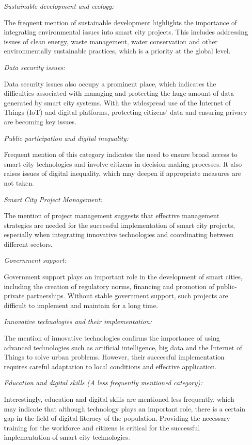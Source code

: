 \begin{multicols}{2}
\emph{Sustainable development and ecology:}

The frequent mention of sustainable development highlights the
importance of integrating environmental issues into smart city projects.
This includes addressing issues of clean energy, waste management, water
conservation and other environmentally sustainable practices, which is a
priority at the global level.

\emph{Data security issues:}

Data security issues also occupy a prominent place, which indicates the
difficulties associated with managing and protecting the huge amount of
data generated by smart city systems. With the widespread use of the
Internet of Things (IoT) and digital platforms, protecting
citizens'{} data and ensuring privacy are becoming key
issues.

\emph{Public participation and digital inequality:}

Frequent mention of this category indicates the need to ensure broad
access to smart city technologies and involve citizens in
decision-making processes. It also raises issues of digital inequality,
which may deepen if appropriate measures are not taken.

\emph{Smart City Project Management:}

The mention of project management suggests that effective management
strategies are needed for the successful implementation of smart city
projects, especially when integrating innovative technologies and
coordinating between different sectors.

\emph{Government support:}

Government support plays an important role in the development of smart
cities, including the creation of regulatory norms, financing and
promotion of public-private partnerships. Without stable government
support, such projects are difficult to implement and maintain for a
long time.

\emph{Innovative technologies and their implementation:}

The mention of innovative technologies confirms the importance of using
advanced technologies such as artificial intelligence, big data and the
Internet of Things to solve urban problems. However, their successful
implementation requires careful adaptation to local conditions and
effective application.

\emph{Education and digital skills (A less frequently mentioned
category):}

Interestingly, education and digital skills are mentioned less
frequently, which may indicate that although technology plays an
important role, there is a certain gap in the field of digital literacy
of the population. Providing the necessary training for the workforce
and citizens is critical for the successful implementation of smart city
technologies.
\end{multicols}

